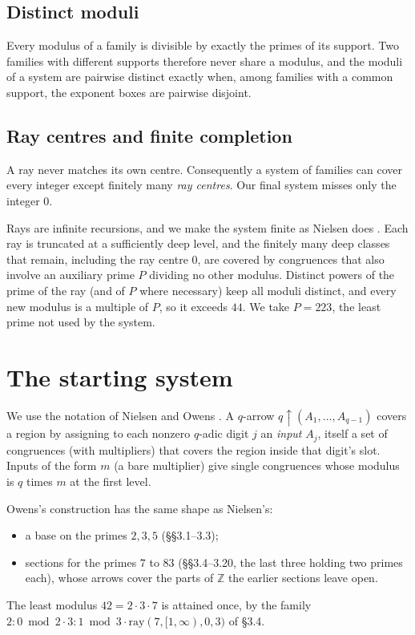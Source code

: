 \documentclass[11pt]{amsart}
\theoremstyle{definition}
\theoremstyle{remark}
\newcommand{\Z}{\mathbb{Z}}
\newcommand{\up}{{\uparrow}}
\begin{document}
\subsection*{Distinct moduli}
Every modulus of a family is divisible by exactly the primes of its support. Two families with different supports
therefore never share a modulus, and the moduli of a system are pairwise distinct exactly when, among families with
a common support, the exponent boxes are pairwise disjoint.

\subsection*{Ray centres and finite completion}
A ray never matches its own centre. Consequently a system of families can cover every integer except finitely many
\emph{ray centres}. Our final system misses only the integer $0$.

Rays are infinite recursions, and we make the system finite as Nielsen does \cite[§2]{Nielsen09}. Each ray is
truncated at a sufficiently deep level, and the finitely many deep classes that remain, including the ray centre
$0$, are covered by congruences that also involve an auxiliary prime $P$ dividing no other modulus. Distinct powers
of the prime of the ray (and of $P$ where necessary) keep all moduli distinct, and every new modulus is a multiple
of $P$, so it exceeds $44$. We take $P=223$, the least prime not used by the system.

\section{The starting system}\label{sec:owens}

We use the notation of Nielsen \cite{Nielsen09} and Owens \cite{Owens14}. A $q$-arrow
$q\up(A_1,\dots,A_{q-1})$ covers a region by assigning to each nonzero $q$-adic digit $j$ an \emph{input} $A_j$,
itself a set of congruences (with multipliers) that covers the region inside that digit's slot. Inputs of the form
$m$ (a bare multiplier) give single congruences whose modulus is $q$ times $m$ at the first level.

Owens's construction has the same shape as Nielsen's:
\begin{itemize}
\item a base on the primes $2,3,5$ (§§3.1–3.3);
\item sections for the primes $7$ to $83$ (§§3.4–3.20, the last three holding two primes each), whose arrows
  cover the parts of $\Z$ the earlier sections leave open.
\end{itemize}
The least modulus $42 = 2\cdot3\cdot7$ is attained once, by the family $2{:}0 \bmod 2 \cdot 3{:}1 \bmod 3 \cdot
\mathrm{ray}(7,[1,\infty),0,3)$ of §3.4.
\end{document}

